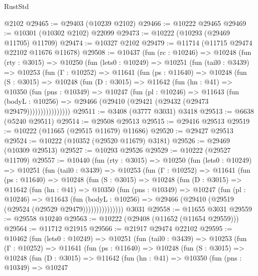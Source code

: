 \begin{lexlean}{RustStd}
\begin{coremodule}
    @2102
@29465 := @29403 (@10239 @2102)
@29466 := @10222 @29465
@29469 := @10301 (@10302 @2102) @22099
@29473 := @10222 (@10293 (@29469 @11705) @11709)
@29474 := @10327 @2102
@29479 := @11714 (@11715 @29474 @22102 @11676 @11678)
@29508 := @10437
    (fun (rc : @10246) =>
    @10248
      (fun (rty : @3015) =>
      @10250
        (fun (lets0 : @10249) =>
        @10251
          (fun (tail0 : @3439) =>
          @10253
            (fun (Γ : @10252) =>
            @11641
              (fun (ps : @11640) =>
              @10248
                (fun (S : @3015) =>
                @10248
                  (fun (D : @3015) =>
                  @11642
                    (fun (hn : @41) =>
                    @10350
                      (fun (pns : @10349) =>
                      @10247
                        (fun (pl : @10246) =>
                        @11643
                          (fun (bodyL : @10256) =>
                          @29466 (@29410 (@29421 (@29432 (@29473 @29479))))))))))))))))
@29511 := @3408 (@3777 @3031) @3418
@29513 := @6638 (@5240 @29511)
@29514 := @29508 @29513
@29515 := @29416 @29513
@29519 := @10222 (@11665 (@29515 @11679) @11686)
@29520 := @29427 @29513
@29524 := @10222 (@10352 (@29520 @11679) @3181)
@29526 := @29469 (@10309 @29513)
@29527 := @10293 @29526
@29529 := @10222 (@29527 @11709)
@29557 := @10440
    (fun (rty : @3015) =>
    @10250
      (fun (lets0 : @10249) =>
      @10251
        (fun (tail0 : @3439) =>
        @10253
          (fun (Γ : @10252) =>
          @11641
            (fun (ps : @11640) =>
            @10248
              (fun (S : @3015) =>
              @10248
                (fun (D : @3015) =>
                @11642
                  (fun (hn : @41) =>
                  @10350
                    (fun (pns : @10349) =>
                    @10247
                      (fun (pl : @10246) =>
                      @11643
                        (fun (bodyL : @10256) =>
                        @29466 (@29410 (@29519 (@29524 (@29529 @29479)))))))))))))))
    @3031
@29558 := @11655 @3031
@29559 := @29558 @10240
@29563 := @10222 (@29408 (@11652 (@11654 @29559)))
@29564 := @11712 @21915
@29566 := @21917 @29474 @22102
@29595 := @10462
    (fun (lets0 : @10249) =>
    @10251
      (fun (tail0 : @3439) =>
      @10253
        (fun (Γ : @10252) =>
        @11641
          (fun (ps : @11640) =>
          @10248
            (fun (S : @3015) =>
            @10248
              (fun (D : @3015) =>
              @11642
                (fun (hn : @41) =>
                @10350
                  (fun (pns : @10349) =>
                  @10247

\end{coremodule}
\end{lexlean}
